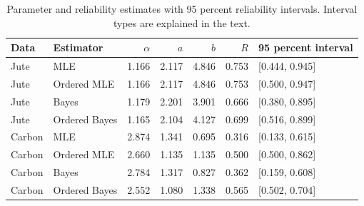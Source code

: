 \begin{table}[htbp]
\centering
\caption{Parameter and reliability estimates with 95 percent reliability intervals. Interval types are explained in the text.}\label{tab:real-estimates}
\small
\begin{tabular}{llrrrrl}
\toprule
Data & Estimator & $\alpha$ & $a$ & $b$ & $R$ & 95 percent interval \\
\midrule
Jute & MLE & 1.166 & 2.117 & 4.846 & 0.753 & [0.444, 0.945] \\
Jute & Ordered MLE & 1.166 & 2.117 & 4.846 & 0.753 & [0.500, 0.947] \\
Jute & Bayes & 1.179 & 2.201 & 3.901 & 0.666 & [0.380, 0.895] \\
Jute & Ordered Bayes & 1.165 & 2.104 & 4.127 & 0.699 & [0.516, 0.899] \\
Carbon & MLE & 2.874 & 1.341 & 0.695 & 0.316 & [0.133, 0.615] \\
Carbon & Ordered MLE & 2.660 & 1.135 & 1.135 & 0.500 & [0.500, 0.862] \\
Carbon & Bayes & 2.784 & 1.317 & 0.827 & 0.362 & [0.159, 0.608] \\
Carbon & Ordered Bayes & 2.552 & 1.080 & 1.338 & 0.565 & [0.502, 0.704] \\
\bottomrule
\end{tabular}
\end{table}
